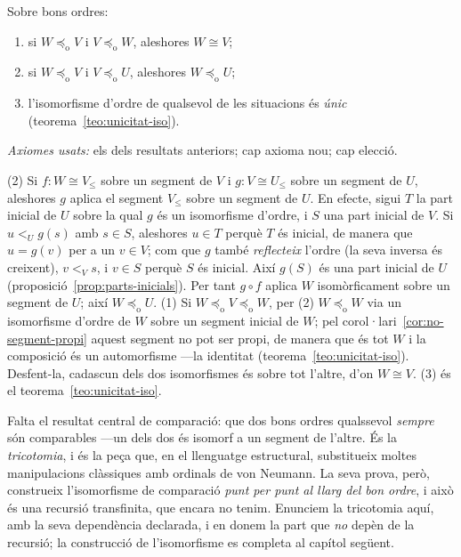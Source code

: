 \begin{proposicio}\label{prop:comparacio-ordres}
Sobre bons ordres:
\begin{enumerate}
\item si \(W\preceq_{\mathrm o}V\) i \(V\preceq_{\mathrm o}W\), aleshores
\(W\cong V\);
\item si \(W\preceq_{\mathrm o}V\) i \(V\preceq_{\mathrm o}U\), aleshores
\(W\preceq_{\mathrm o}U\);
\item l'isomorfisme d'ordre de qualsevol de les situacions és \emph{únic}
(teorema~\ref{teo:unicitat-iso}).
\end{enumerate}
\emph{Axiomes usats:} els dels resultats anteriors; cap axioma nou; cap
elecció.
\end{proposicio}

\begin{prova}
(2) Si \(f\colon W\cong V_{\le}\) sobre un segment de \(V\) i \(g\colon
V\cong U_{\le}\) sobre un segment de \(U\), aleshores \(g\) aplica el segment
\(V_{\le}\) sobre un segment de \(U\). En efecte, sigui \(T\) la part
inicial de \(U\) sobre la qual \(g\) és un isomorfisme d'ordre, i \(S\) una
part inicial de \(V\). Si \(u<_U g(s)\) amb \(s\in S\), aleshores \(u\in T\)
perquè \(T\) és inicial, de manera que \(u=g(v)\) per a un \(v\in V\); com que
\(g\) també \emph{reflecteix} l'ordre (la seva inversa és creixent),
\(v<_V s\), i \(v\in S\) perquè \(S\) és inicial. Així \(g(S)\) és una part
inicial de \(U\) (proposició~\ref{prop:parts-inicials}). Per tant \(g\circ f\) aplica
\(W\) isomòrficament sobre un segment de \(U\); així \(W\preceq_{\mathrm
o}U\). (1) Si \(W\preceq_{\mathrm o}V\preceq_{\mathrm o}W\), per (2)
\(W\preceq_{\mathrm o}W\) via un isomorfisme d'ordre de \(W\) sobre un
segment inicial de \(W\); pel corol·lari~\ref{cor:no-segment-propi} aquest
segment no pot ser propi, de manera que és tot \(W\) i la composició és un
automorfisme ---la identitat (teorema~\ref{teo:unicitat-iso}). Desfent-la,
cadascun dels dos isomorfismes és sobre tot l'altre, d'on \(W\cong V\). (3)
és el teorema~\ref{teo:unicitat-iso}.
\end{prova}

Falta el resultat central de comparació: que dos bons ordres qualssevol
\emph{sempre} són comparables ---un dels dos és isomorf a un segment de
l'altre. És la \emph{tricotomia}, i és la peça que, en el llenguatge
estructural, substitueix moltes manipulacions clàssiques amb ordinals de von
Neumann. La seva prova, però, construeix l'isomorfisme de comparació
\emph{punt per punt al llarg del bon ordre}, i això és una recursió
transfinita, que encara no tenim. Enunciem la tricotomia aquí, amb la seva
dependència declarada, i en donem la part que \emph{no} depèn de la recursió;
la construcció de l'isomorfisme es completa al capítol següent.

